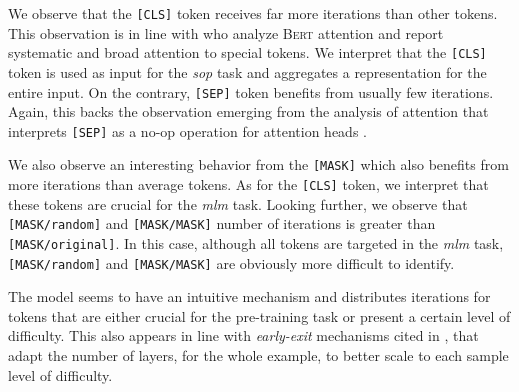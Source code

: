 We observe that the \texttt{[CLS]} token receives far more iterations than other tokens. This observation is in line with \textcite{clark_19} who analyze \textsc{Bert}  attention and report systematic and broad attention to special tokens. We interpret that the \texttt{[CLS]} token is used as input for the \textit{sop} task and aggregates a representation for the entire input. On the contrary, \texttt{[SEP]} token benefits from usually few iterations. Again, this backs the observation emerging from the analysis of attention that interprets \texttt{[SEP]} as a no-op operation for attention heads \parencite{clark_19}.


We also observe an interesting behavior from the \texttt{[MASK]} which also benefits from more iterations than average tokens. As for the \texttt{[CLS]} token, we interpret that these tokens are crucial for the \textit{mlm} task. Looking further, we observe that \texttt{[MASK/random]} and \texttt{[MASK/MASK]} number of iterations is greater than \texttt{[MASK/original]}. In this case, although all tokens are targeted in the \textit{mlm} task, \texttt{[MASK/random]} and \texttt{[MASK/MASK]} are  obviously more difficult to identify.

The model seems to have an intuitive mechanism and distributes iterations for tokens that are either crucial for the pre-training task or present a certain level of difficulty. This also appears in line with \textit{early-exit} mechanisms cited in , that adapt the number of layers, for the whole example, to better scale to each sample level of difficulty.

